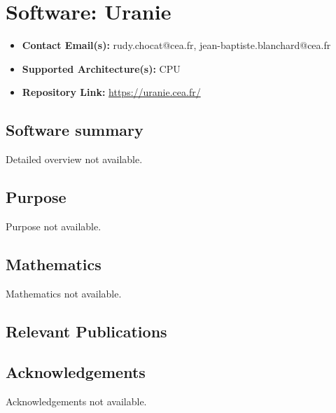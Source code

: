 \section{Software: Uranie}
\label{sec:Uranie:software}



\begin{itemize}
    \item \textbf{Contact Email(s):} rudy.chocat@cea.fr, jean-baptiste.blanchard@cea.fr
    \item \textbf{Supported Architecture(s):} CPU
    \item \textbf{Repository Link:} \href{https://uranie.cea.fr/}{https://uranie.cea.fr/}
\end{itemize}

\subsection{Software summary}
\label{sec:Uranie:summary}
Detailed overview not available.



\subsection{Purpose}
\label{sec:Uranie:purpose}
Purpose not available.



\subsection{Mathematics}
\label{sec:Uranie:mathematics}
Mathematics not available.


\subsection{Relevant Publications}
\label{sec:Uranie:publications}

\subsection{Acknowledgements}
\label{sec::Uranie:acknowledgements}

Acknowledgements not available.


